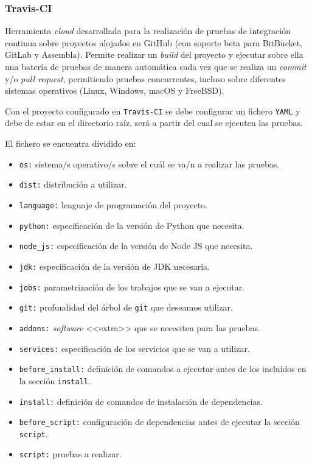 
\subsubsection{Travis-CI}
Herramienta \textit{cloud} desarrollada para la realización de pruebas de integración continua sobre proyectos alojados en GitHub (con soporte beta para BitBucket, GitLab y Assembla). Permite realizar un \textit{build} del proyecto y ejecutar sobre ella una batería de pruebas de manera automática cada vez que se realiza un \textit{commit} y/o \textit{pull request}, permitiendo pruebas concurrentes, incluso sobre diferentes sistemas operativos (Linux, Windows, macOS y FreeBSD). 

Con el proyecto configurado en \texttt{Travis-CI} se debe configurar un fichero \texttt{YAML} y debe de estar en el directorio raíz, será a partir del cual se ejecuten las pruebas.

El fichero se encuentra dividido en:
\begin{itemize}
\tightlist
\item \texttt{os:} sistema/s operativo/s sobre el cuál se va/n a realizar las pruebas.
\item \texttt{dist:} distribución a utilizar.
\item \texttt{language:} lenguaje de programación del proyecto.
\item \texttt{python:} especificación de la versión de Python que necesita.
\item \texttt{node\_js:} especificación de la versión de Node JS que necesita.
\item \texttt{jdk:} especificación de la versión de JDK necesaria.
\item \texttt{jobs:} parametrización de los trabajos que se van a ejecutar.
\item \texttt{git:} profundidad del árbol de \texttt{git} que deseamos utilizar.
\item \texttt{addons:} \textit{software} <<extra>> que se necesiten para las pruebas.
\item \texttt{services:} especificación de los servicios que se van a utilizar.
\item \texttt{before\_install:} definición de comandos a ejecutar antes de los incluidos en la sección \texttt{install}.
\item \texttt{install:} definición de comandos de instalación de dependencias.
\item \texttt{before\_script:} configuración de dependencias antes de ejecutar la sección \texttt{script}.
\item \texttt{script:} pruebas a realizar.
\end{itemize}

